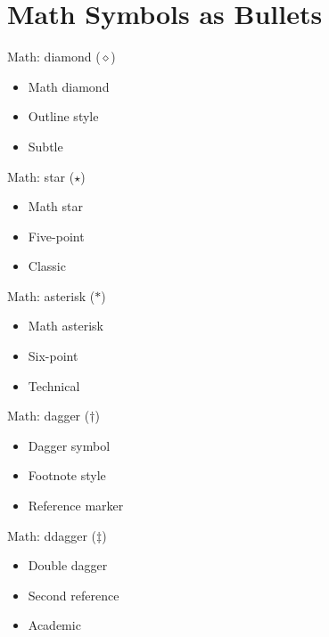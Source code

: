 \documentclass[12pt]{beamer}
\begin{document}
\section{Math Symbols as Bullets}

\begin{frame}{Math: diamond ($\diamond$)}
\begin{itemize}
  \item Math diamond
  \item Outline style
  \item Subtle
\end{itemize}
\end{frame}

\begin{frame}{Math: star ($\star$)}
\begin{itemize}
  \item Math star
  \item Five-point
  \item Classic
\end{itemize}
\end{frame}

\begin{frame}{Math: asterisk ($\ast$)}
\begin{itemize}
  \item Math asterisk
  \item Six-point
  \item Technical
\end{itemize}
\end{frame}

\begin{frame}{Math: dagger ($\dagger$)}
\begin{itemize}
  \item Dagger symbol
  \item Footnote style
  \item Reference marker
\end{itemize}
\end{frame}

\begin{frame}{Math: ddagger ($\ddagger$)}
\begin{itemize}
  \item Double dagger
  \item Second reference
  \item Academic
\end{itemize}
\end{frame}
\end{document}
